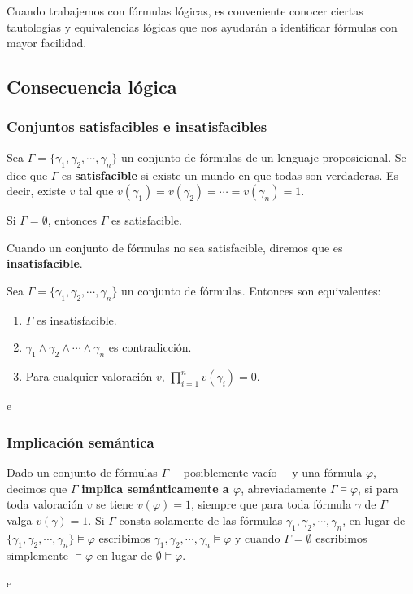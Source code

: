 Cuando trabajemos con fórmulas lógicas, es conveniente conocer ciertas tautologías y equivalencias lógicas que nos ayudarán a identificar fórmulas con mayor facilidad.

\subsection{Consecuencia lógica}
\subsubsection{Conjuntos satisfacibles e insatisfacibles}
\begin{ndef}
    Sea $\Gamma = \{\gamma_1, \gamma_2, \cdots, \gamma_n\}$ un conjunto de fórmulas de un lenguaje proposicional. Se dice que $\Gamma$ es \textbf{satisfacible} si existe un mundo en que todas son verdaderas.
    Es decir, existe $v$ tal que $v(\gamma_1) = v(\gamma_2) = \cdots = v(\gamma_n) = 1$.
\end{ndef}
\begin{nota}
    Si $\Gamma = \emptyset$, entonces $\Gamma$ es satisfacible.
\end{nota}
Cuando un conjunto de fórmulas no sea satisfacible, diremos que es \textbf{insatisfacible}.

\begin{nth}
    Sea $\Gamma = \{\gamma_1, \gamma_2, \cdots, \gamma_n\}$ un conjunto de fórmulas. Entonces son equivalentes:
    \begin{enumerate}
        \item $\Gamma$ es insatisfacible.
        \item $\gamma_1 \land \gamma_2 \land \cdots \land \gamma_n$ es contradicción.
        \item Para cualquier valoración $v$, $\prod^n_{i=1} v(\gamma_i) = 0$.
    \end{enumerate}
\end{nth}
\begin{ejemplo}
    e
\end{ejemplo}

\subsubsection{Implicación semántica}
\begin{ndef}
    Dado un conjunto de fórmulas $\Gamma$ —posiblemente vacío— y una fórmula $\varphi$, decimos que $\Gamma$ \textbf{implica semánticamente a $\varphi$}, abreviadamente $\Gamma \models \varphi$, si para toda valoración $v$ se tiene $v(\varphi) = 1$, siempre que para toda fórmula $\gamma$ de $\Gamma$ valga $v(\gamma) = 1$.
    Si $\Gamma$ consta solamente de las fórmulas $\gamma_1, \gamma_2, \cdots, \gamma_n$, en lugar de$\{\gamma_1, \gamma_2, \cdots, \gamma_n\} \models \varphi$ escribimos $\gamma_1, \gamma_2, \cdots, \gamma_n \models \varphi$ y cuando $\Gamma = \emptyset$ escribimos simplemente $\models \varphi$ en lugar de $\emptyset \models \varphi$.
\end{ndef}
\begin{ejemplo}
    e
\end{ejemplo}


